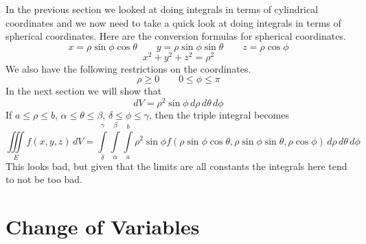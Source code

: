 \documentclass[10pt,reqno]{book}
\theoremstyle{definition}
\begin{document}
	In the previous section we looked at doing integrals in terms of cylindrical coordinates and we now need to take a quick look at doing integrals in terms of spherical coordinates. Here are the conversion formulas for spherical coordinates.
	\[ x = \rho\sin\phi\cos\theta \qquad y = \rho\sin\phi\sin\theta \qquad z = \rho\cos\phi\]
	\[ x^2 + y^2 + z^2 = \rho^2  \]
	We also have the following restrictions on the coordinates.
	\[ \rho \geq 0 \qquad 0 \leq \phi \leq \pi \]
	In the next section we will show that 
	\[ dV = \rho^2 \sin\phi\, d\rho \, d\theta \, d\phi \]
	If $ a \leq \rho \leq b $, $ \alpha \leq \theta \leq \beta $, $ \delta \leq \phi \leq \gamma $, then the triple integral becomes
	\[ \iiint\limits_E f(x,y,z)\,dV = \int\limits_{\delta}^{\gamma} \int\limits_{\alpha}^{\beta} \int\limits_{a}^{b} \rho^2 \sin\phi f(\rho\sin\phi\cos\theta,\rho\sin\phi\sin\theta,\rho\cos\phi)\,d\rho \, d\theta \, d\phi \]
	This looks bad, but given that the limits are all constants the integrals here tend to not be too bad.
	
	\section{Change of Variables}
	
\end{document}
